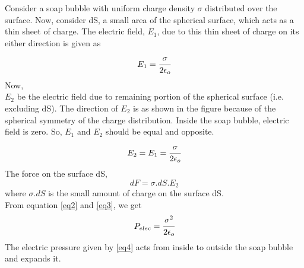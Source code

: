Consider a soap bubble with uniform charge density $\sigma$ distributed over the surface. Now, consider dS, a small area of the spherical surface, which acts as a thin sheet of charge. The electric field, $E_1$, due to this thin sheet of charge on its either direction is given as 
\begin{equation}\label{eq1}
    E_1 = \cfrac{\sigma}{2\epsilon_o}
\end{equation}
Now,\\
$E_2$ be the electric field due to remaining portion of the spherical surface (i.e. excluding dS). The direction of $E_2$ is as shown in the figure because of the spherical symmetry of the charge distribution. Inside the soap bubble, electric field is zero. So, $E_1$ and $E_2$ should be equal and opposite. 
\begin{equation}\label{eq2}
    E_2 = E_1 = \cfrac{\sigma}{2\epsilon_o}
\end{equation}
The force on the surface dS, 
\begin{equation}\label{eq3}
    dF = \sigma . dS . E_2
\end{equation}
where $\sigma . dS$ is the small amount of charge on the surface dS.\\
From equation \ref{eq2} and \ref{eq3}, we get
\begin{equation}\label{eq4}
    P_{elec} = \cfrac{\sigma^2}{2\epsilon_o}
\end{equation}
The electric pressure given by \ref{eq4} acts from inside to outside the soap bubble and expands it.\\

